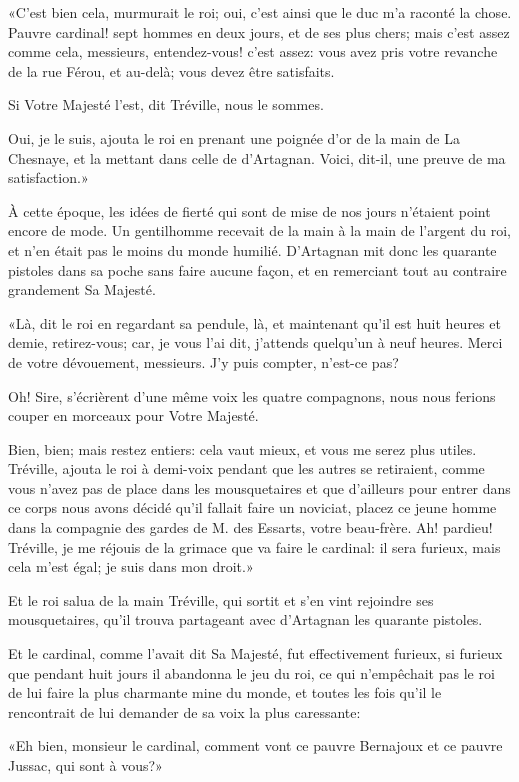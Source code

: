 «C'est bien cela, murmurait le roi; oui, c'est ainsi que le duc m'a raconté la chose. Pauvre cardinal! sept hommes en deux jours, et de ses plus chers; mais c'est assez comme cela, messieurs, entendez-vous! c'est assez: vous avez pris votre revanche de la rue Férou, et au-delà; vous devez être satisfaits. 

\speak  Si Votre Majesté l'est, dit Tréville, nous le sommes. 

\speak  Oui, je le suis, ajouta le roi en prenant une poignée d'or de la main de La Chesnaye, et la mettant dans celle de d'Artagnan. Voici, dit-il, une preuve de ma satisfaction.» 

À cette époque, les idées de fierté qui sont de mise de nos jours n'étaient point encore de mode. Un gentilhomme recevait de la main à la main de l'argent du roi, et n'en était pas le moins du monde humilié. D'Artagnan mit donc les quarante pistoles dans sa poche sans faire aucune façon, et en remerciant tout au contraire grandement Sa Majesté. 

«Là, dit le roi en regardant sa pendule, là, et maintenant qu'il est huit heures et demie, retirez-vous; car, je vous l'ai dit, j'attends quelqu'un à neuf heures. Merci de votre dévouement, messieurs. J'y puis compter, n'est-ce pas? 

\speak  Oh! Sire, s'écrièrent d'une même voix les quatre compagnons, nous nous ferions couper en morceaux pour Votre Majesté. 

\speak  Bien, bien; mais restez entiers: cela vaut mieux, et vous me serez plus utiles. Tréville, ajouta le roi à demi-voix pendant que les autres se retiraient, comme vous n'avez pas de place dans les mousquetaires et que d'ailleurs pour entrer dans ce corps nous avons décidé qu'il fallait faire un noviciat, placez ce jeune homme dans la compagnie des gardes de M. des Essarts, votre beau-frère. Ah! pardieu! Tréville, je me réjouis de la grimace que va faire le cardinal: il sera furieux, mais cela m'est égal; je suis dans mon droit.» 

Et le roi salua de la main Tréville, qui sortit et s'en vint rejoindre ses mousquetaires, qu'il trouva partageant avec d'Artagnan les quarante pistoles. 

Et le cardinal, comme l'avait dit Sa Majesté, fut effectivement furieux, si furieux que pendant huit jours il abandonna le jeu du roi, ce qui n'empêchait pas le roi de lui faire la plus charmante mine du monde, et toutes les fois qu'il le rencontrait de lui demander de sa voix la plus caressante: 

«Eh bien, monsieur le cardinal, comment vont ce pauvre Bernajoux et ce pauvre Jussac, qui sont à vous?» 